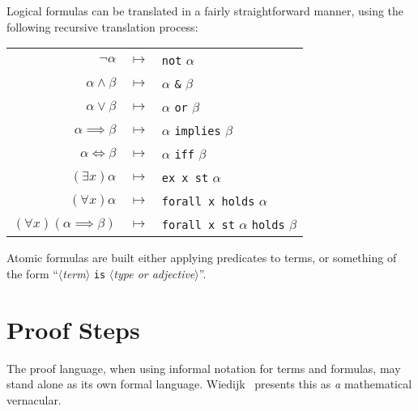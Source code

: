 \begin{node}[Formulas]\label{mizar-0003}%
Logical formulas can be translated in a fairly straightforward manner,
using the following recursive translation process:
\begin{center}
\begin{tabular}{rcl}
$\neg\alpha$ & $\mapsto$ & \texttt{not} $\alpha$\\
$\alpha\land\beta$ & $\mapsto$ & $\alpha$ \texttt{\&} $\beta$\\
$\alpha\lor\beta$ & $\mapsto$ & $\alpha$ \texttt{or} $\beta$\\
$\alpha\implies\beta$ & $\mapsto$ & $\alpha$ \texttt{implies} $\beta$\\
$\alpha\iff\beta$ & $\mapsto$ & $\alpha$ \texttt{iff} $\beta$\\
$(\exists x)\alpha$ & $\mapsto$ & \texttt{ex x st} $\alpha$\\
$(\forall x)\alpha$ & $\mapsto$ & \texttt{forall x holds} $\alpha$\\
$(\forall x)(\alpha\implies\beta)$ & $\mapsto$ & \texttt{forall x st} $\alpha$ \texttt{holds} $\beta$\\
\end{tabular}
\end{center}
Atomic formulas are built either applying predicates to terms, or
something of the form ``$\langle$\textit{term}$\rangle$ \texttt{is}
$\langle$\textit{type or adjective}$\rangle$''.
\end{node}

\section{Proof Steps}

\begin{node}\label{mizar-0002}%
The proof language, when using informal notation for terms and formulas,
may stand alone as its own formal language. Wiedijk~\cite{wiedijk2000vernacular}
presents this as \emph{a} mathematical vernacular.
\end{node}
